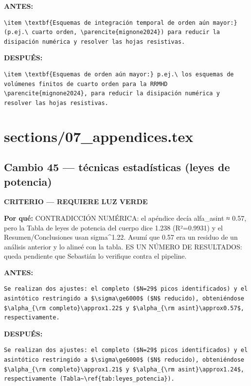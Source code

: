\documentclass[11pt,a4paper]{article}
\begin{document}
\textcolor{antesline}{\textbf{ANTES:}}
\begin{Verbatim}[breaklines=true, breakanywhere=true, fontsize=\small, frame=leftline, rulecolor=\color{antesline}, framerule=1.2pt]
\item \textbf{Esquemas de integración temporal de orden aún mayor:} (p.ej.\ cuarto orden, \parencite{mignone2024}) para reducir la disipación numérica y resolver las hojas resistivas.
\end{Verbatim}
\textcolor{despline}{\textbf{DESPUÉS:}}
\begin{Verbatim}[breaklines=true, breakanywhere=true, fontsize=\small, frame=leftline, rulecolor=\color{despline}, framerule=1.2pt]
\item \textbf{Esquemas de orden aún mayor:} p.ej.\ los esquemas de volúmenes finitos de cuarto orden para la RRMHD \parencite{mignone2024}, para reducir la disipación numérica y resolver las hojas resistivas.
\end{Verbatim}


\section*{sections/07\_appendices.tex}
\subsection*{Cambio 45 --- técnicas estadísticas (leyes de potencia)}
\colorbox{critbg}{\textbf{\footnotesize CRITERIO --- REQUIERE LUZ VERDE}}

\textbf{Por qué:} CONTRADICCIÓN NUMÉRICA: el apéndice decía alfa\_asint ≈ 0.57, pero la Tabla de leyes de potencia del cuerpo dice 1.238 (R²=0.9931) y el Resumen/Conclusiones usan sigma\textasciicircum{}1.22. Asumí que 0.57 era un residuo de un análisis anterior y lo alineé con la tabla. ES UN NÚMERO DE RESULTADOS: queda pendiente que Sebastián lo verifique contra el pipeline.

\textcolor{antesline}{\textbf{ANTES:}}
\begin{Verbatim}[breaklines=true, breakanywhere=true, fontsize=\small, frame=leftline, rulecolor=\color{antesline}, framerule=1.2pt]
Se realizan dos ajustes: el completo ($N=29$ picos identificados) y el asintótico restringido a $\sigma\ge6000$ ($N$ reducido), obteniéndose $\alpha_{\rm completo}\approx1.22$ y $\alpha_{\rm asint}\approx0.57$, respectivamente.
\end{Verbatim}
\textcolor{despline}{\textbf{DESPUÉS:}}
\begin{Verbatim}[breaklines=true, breakanywhere=true, fontsize=\small, frame=leftline, rulecolor=\color{despline}, framerule=1.2pt]
Se realizan dos ajustes: el completo ($N=29$ picos identificados) y el asintótico restringido a $\sigma\ge6000$ ($N$ reducido), obteniéndose $\alpha_{\rm completo}\approx1.21$ y $\alpha_{\rm asint}\approx1.24$, respectivamente (Tabla~\ref{tab:leyes_potencia}).
\end{Verbatim}
\end{document}
